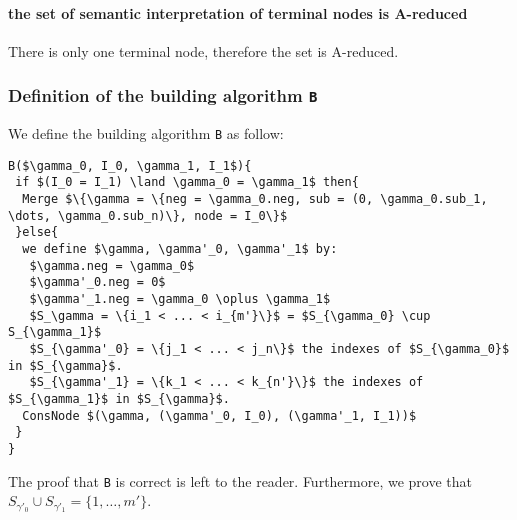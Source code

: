 \documentclass[a4paper,10pt]{article}
\begin{document}
\paragraph{the set of semantic interpretation of terminal nodes is A-reduced\\}
There is only one terminal node, therefore the set is A-reduced.

\subsubsection{Definition of the building algorithm \texttt{B}}
We define the building algorithm \texttt{B} as follow: 
\begin{lstlisting}
B($\gamma_0, I_0, \gamma_1, I_1$){
 if $(I_0 = I_1) \land \gamma_0 = \gamma_1$ then{
  Merge $\{\gamma = \{neg = \gamma_0.neg, sub = (0, \gamma_0.sub_1, \dots, \gamma_0.sub_n)\}, node = I_0\}$
 }else{
  we define $\gamma, \gamma'_0, \gamma'_1$ by: 
   $\gamma.neg = \gamma_0$
   $\gamma'_0.neg = 0$
   $\gamma'_1.neg = \gamma_0 \oplus \gamma_1$
   $S_\gamma = \{i_1 < ... < i_{m'}\}$ = $S_{\gamma_0} \cup S_{\gamma_1}$
   $S_{\gamma'_0} = \{j_1 < ... < j_n\}$ the indexes of $S_{\gamma_0}$ in $S_{\gamma}$.
   $S_{\gamma'_1} = \{k_1 < ... < k_{n'}\}$ the indexes of $S_{\gamma_1}$ in $S_{\gamma}$.
  ConsNode $(\gamma, (\gamma'_0, I_0), (\gamma'_1, I_1))$
 }
} 
\end{lstlisting}
The proof that \texttt{B} is correct is left to the reader.
Furthermore, we prove that $S_{\gamma'_0}\cup S_{\gamma'_1} = \{1, \dots, m'\}$.
\end{document}
